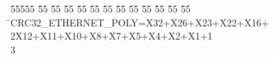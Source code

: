 %
%
\begin{tabbing}
55555 \= 55 \= 55 \= 55 \= 55 \= 55 \= 55 \= 55 \= 55 \= 55 \= 55 \= 55 \= 55 \= \>CRC32\_ETHERNET\_POLY=X32+X26+X23+X22+X16+\\[0pt]
2\>X12+X11+X10+X8+X7+X5+X4+X2+X1+1\\[0pt]
3\>\end{tabbing}
